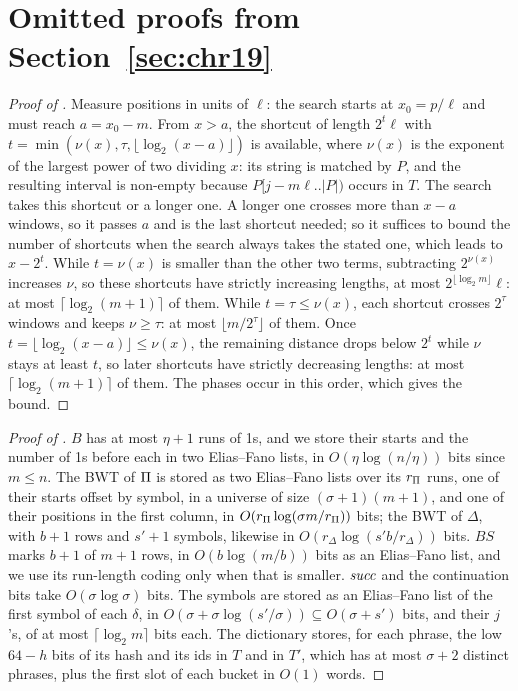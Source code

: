 \section{Omitted proofs from Section~\ref{sec:chr19}}
\label{app:proofs}

\begin{proof}[Proof of ]
Measure positions in units of $\ell$: the search starts at $x_0 =
p/\ell$ and must reach $a = x_0 - m$. From $x > a$, the shortcut of
length $2^t\ell$ with $t = \min(\nu(x), \tau, \lfloor \log_2(x - a)
\rfloor)$ is available, where $\nu(x)$ is the exponent of the largest
power of two dividing $x$: its string is matched by $P$, and the
resulting interval is non-empty because $P[j - m\ell .. |P|)$ occurs in
$T$. The search takes this shortcut or a longer one. A longer one
crosses more than $x - a$ windows, so it passes $a$ and is the last
shortcut needed; so it suffices to bound the number of shortcuts when
the search always takes the stated one, which leads to $x - 2^t$. While
$t = \nu(x)$ is smaller than the other two terms, subtracting
$2^{\nu(x)}$ increases $\nu$, so these shortcuts have strictly
increasing lengths, at most $2^{\lfloor \log_2 m \rfloor}\ell$: at most
$\lceil \log_2(m+1) \rceil$ of them. While $t = \tau \le \nu(x)$, each
shortcut crosses $2^\tau$ windows and keeps $\nu \ge \tau$: at most
$\lfloor m / 2^\tau \rfloor$ of them. Once $t = \lfloor \log_2(x - a)
\rfloor \le \nu(x)$, the remaining distance drops below $2^t$ while
$\nu$ stays at least $t$, so later shortcuts have strictly decreasing
lengths: at most $\lceil \log_2(m+1) \rceil$ of them. The phases occur
in this order, which gives the bound.
\end{proof}

\begin{proof}[Proof of ]
$B$ has at most $\eta + 1$ runs of 1s, and we store their starts and the
number of 1s before each in two Elias--Fano lists, in $O(\eta
\log(n/\eta))$ bits since $m \le n$. The BWT of $\Pi$ is stored as two
Elias--Fano lists over its $r_\Pi$ runs, one of their starts offset by
symbol, in a universe of size $(\sigma + 1)(m + 1)$, and one of their
positions in the first column, in $O(r_\Pi \log(\sigma m / r_\Pi))$
bits; the BWT of $\Delta$, with $b + 1$ rows and $s' + 1$ symbols,
likewise in $O(r_\Delta \log(s' b / r_\Delta))$ bits. $BS$ marks $b + 1$
of $m + 1$ rows, in $O(b \log(m/b))$ bits as an Elias--Fano list, and we
use its run-length coding only when that is smaller. $\mathit{succ}$ and the
continuation bits take $O(\sigma \log \sigma)$ bits. The symbols are
stored as an Elias--Fano list of the first symbol of each $\delta$, in
$O(\sigma + \sigma \log(s'/\sigma)) \subseteq O(\sigma + s')$ bits, and
their $j$'s, of at most $\lceil \log_2 m \rceil$ bits each. The
dictionary stores, for each phrase, the low $64 - h$ bits of its hash
and its ids in $T$ and in $T'$, which has at most $\sigma + 2$ distinct
phrases, plus the first slot of each bucket in $O(1)$ words.
\end{proof}
